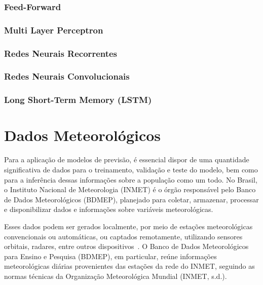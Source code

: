         \subsubsection{Feed-Forward}
        \subsubsection{Multi Layer Perceptron}
        \subsubsection{Redes Neurais Recorrentes}
        \subsubsection{Redes Neurais Convolucionais}
        \subsubsection{Long Short-Term Memory (LSTM)}


\section{Dados Meteorológicos}

    Para a aplicação de modelos de previsão, é essencial dispor de uma quantidade significativa de dados para o 
    treinamento, validação e teste do modelo, bem como para a inferência dessas informações sobre a população como um 
    todo. No Brasil, o Instituto Nacional de Meteorologia (INMET) é o órgão responsável pelo Banco de Dados 
    Meteorológicos (BDMEP), planejado para coletar, armazenar, processar e disponibilizar dados e informações sobre 
    variáveis meteorológicas. 
    
    Esses dados podem ser gerados localmente, por meio de estações meteorológicas convencionais ou automáticas, 
    ou captados remotamente, utilizando sensores orbitais, radares, entre outros dispositivos~\cite{vianna2017}. 
    O Banco de Dados Meteorológicos para Ensino e Pesquisa (BDMEP), em particular, reúne informações meteorológicas 
    diárias provenientes das estações da rede do INMET, seguindo as normas técnicas da Organização Meteorológica 
    Mundial (INMET, s.d.).